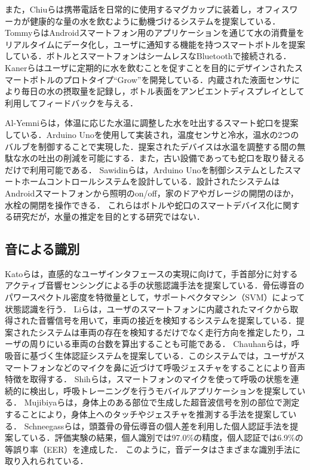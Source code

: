 \documentclass[submit,techrep,noauthor]{ipsj}
\begin{document}
また，Chiuら\cite{PlayfulBottle}は携帯電話を日常的に使用するマグカップに装着し，オフィスワーカが健康的な量の水を飲むように動機づけるシステムを提案している．
Tommyら\cite{SmartBottle}はAndroidスマートフォン用のアプリケーションを通じて水の消費量をリアルタイムにデータ化し，ユーザに通知する機能を持つスマートボトルを提案している．ボトルとスマートフォンはシームレスなBluetoothで接続される．
Kanerら\cite{GROW}はユーザに定期的に水を飲むことを促すことを目的にデザインされたスマートボトルのプロトタイプ``Grow''を開発している．内蔵された液面センサにより毎日の水の摂取量を記録し，ボトル表面をアンビエントディスプレイとして利用してフィードバックを与える．

Al-Yemniら\cite{smart_faucet2}は，体温に応じた水温に調整した水を吐出するスマート蛇口を提案している．Arduino Unoを使用して実装され，温度センサと冷水，温水の2つのバルブを制御することで実現した．提案されたデバイスは水温を調整する間の無駄な水の吐出の削減を可能にする．また，古い設備であっても蛇口を取り替えるだけで利用可能である．
Sawidinら\cite{smart_faucet3}は，Arduino Unoを制御システムとしたスマートホームコントロールシステムを設計している．設計されたシステムはAndroidスマートフォンから照明のon/off，家のドアやガレージの開閉のほか，水栓の開閉を操作できる．
これらはボトルや蛇口のスマートデバイス化に関する研究だが，水量の推定を目的とする研究ではない．


\subsection{音による識別}
Katoら\cite{sound_sensing1}は，直感的なユーザインタフェースの実現に向けて，手首部分に対するアクティブ音響センシングによる手の状態認識手法を提案している．骨伝導音のパワースペクトル密度を特徴量として，サポートベクタマシン（SVM）によって状態認識を行う．
Liら\cite{Auto++}は，ユーザのスマートフォンに内蔵されたマイクから取得された音響信号を用いて，車両の接近を検知するシステムを提案している．提案されたシステムは車両の存在を検知するだけでなく走行方向を推定したり，ユーザの周りにいる車両の台数を算出することも可能である．
Chauhanら\cite{BreathPrint}は，呼吸音に基づく生体認証システムを提案している．このシステムでは，ユーザがスマートフォンなどのマイクを鼻に近づけて呼吸ジェスチャをすることにより音声特徴を取得する．
Shihら\cite{Breeze}は，スマートフォンのマイクを使って呼吸の状態を連続的に検出し，呼吸トレーニングを行うモバイルアプリケーションを提案している．
Mujibiyaら\cite{sound_sensing2}は，身体上のある部位で生成した超音波信号を別の部位で測定することにより，身体上へのタッチやジェスチャを推測する手法を提案している．
Schneegassら\cite{SkullConduct}は，頭蓋骨の骨伝導音の個人差を利用した個人認証手法を提案している．評価実験の結果，個人識別では97.0\%の精度，個人認証では6.9\%の等誤り率（EER）を達成した．
このように，音データはさまざまな識別手法に取り入れられている．
\end{document}
